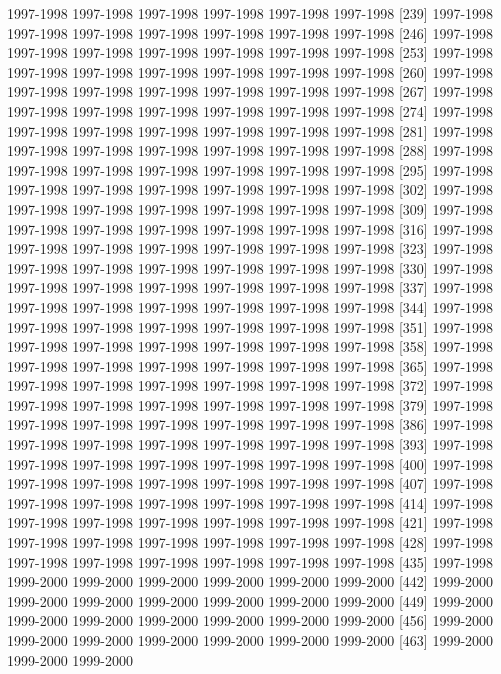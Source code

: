 \documentclass[
]{article}
\begin{document}
1997-1998 1997-1998 1997-1998 1997-1998 1997-1998 1997-1998 {[}239{]}
1997-1998 1997-1998 1997-1998 1997-1998 1997-1998 1997-1998 1997-1998
{[}246{]} 1997-1998 1997-1998 1997-1998 1997-1998 1997-1998 1997-1998
1997-1998 {[}253{]} 1997-1998 1997-1998 1997-1998 1997-1998 1997-1998
1997-1998 1997-1998 {[}260{]} 1997-1998 1997-1998 1997-1998 1997-1998
1997-1998 1997-1998 1997-1998 {[}267{]} 1997-1998 1997-1998 1997-1998
1997-1998 1997-1998 1997-1998 1997-1998 {[}274{]} 1997-1998 1997-1998
1997-1998 1997-1998 1997-1998 1997-1998 1997-1998 {[}281{]} 1997-1998
1997-1998 1997-1998 1997-1998 1997-1998 1997-1998 1997-1998 {[}288{]}
1997-1998 1997-1998 1997-1998 1997-1998 1997-1998 1997-1998 1997-1998
{[}295{]} 1997-1998 1997-1998 1997-1998 1997-1998 1997-1998 1997-1998
1997-1998 {[}302{]} 1997-1998 1997-1998 1997-1998 1997-1998 1997-1998
1997-1998 1997-1998 {[}309{]} 1997-1998 1997-1998 1997-1998 1997-1998
1997-1998 1997-1998 1997-1998 {[}316{]} 1997-1998 1997-1998 1997-1998
1997-1998 1997-1998 1997-1998 1997-1998 {[}323{]} 1997-1998 1997-1998
1997-1998 1997-1998 1997-1998 1997-1998 1997-1998 {[}330{]} 1997-1998
1997-1998 1997-1998 1997-1998 1997-1998 1997-1998 1997-1998 {[}337{]}
1997-1998 1997-1998 1997-1998 1997-1998 1997-1998 1997-1998 1997-1998
{[}344{]} 1997-1998 1997-1998 1997-1998 1997-1998 1997-1998 1997-1998
1997-1998 {[}351{]} 1997-1998 1997-1998 1997-1998 1997-1998 1997-1998
1997-1998 1997-1998 {[}358{]} 1997-1998 1997-1998 1997-1998 1997-1998
1997-1998 1997-1998 1997-1998 {[}365{]} 1997-1998 1997-1998 1997-1998
1997-1998 1997-1998 1997-1998 1997-1998 {[}372{]} 1997-1998 1997-1998
1997-1998 1997-1998 1997-1998 1997-1998 1997-1998 {[}379{]} 1997-1998
1997-1998 1997-1998 1997-1998 1997-1998 1997-1998 1997-1998 {[}386{]}
1997-1998 1997-1998 1997-1998 1997-1998 1997-1998 1997-1998 1997-1998
{[}393{]} 1997-1998 1997-1998 1997-1998 1997-1998 1997-1998 1997-1998
1997-1998 {[}400{]} 1997-1998 1997-1998 1997-1998 1997-1998 1997-1998
1997-1998 1997-1998 {[}407{]} 1997-1998 1997-1998 1997-1998 1997-1998
1997-1998 1997-1998 1997-1998 {[}414{]} 1997-1998 1997-1998 1997-1998
1997-1998 1997-1998 1997-1998 1997-1998 {[}421{]} 1997-1998 1997-1998
1997-1998 1997-1998 1997-1998 1997-1998 1997-1998 {[}428{]} 1997-1998
1997-1998 1997-1998 1997-1998 1997-1998 1997-1998 1997-1998 {[}435{]}
1997-1998 1999-2000 1999-2000 1999-2000 1999-2000 1999-2000 1999-2000
{[}442{]} 1999-2000 1999-2000 1999-2000 1999-2000 1999-2000 1999-2000
1999-2000 {[}449{]} 1999-2000 1999-2000 1999-2000 1999-2000 1999-2000
1999-2000 1999-2000 {[}456{]} 1999-2000 1999-2000 1999-2000 1999-2000
1999-2000 1999-2000 1999-2000 {[}463{]} 1999-2000 1999-2000 1999-2000
\end{document}
